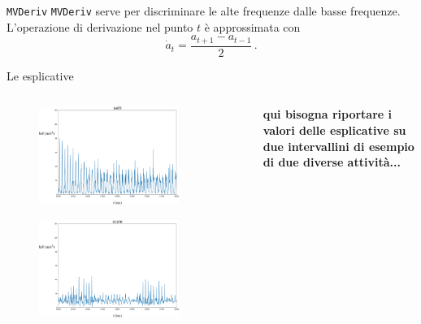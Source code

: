\documentclass{beamer}
\begin{document}
\begin{frame}{\texttt{MVDeriv}}
\texttt{MVDeriv} serve per discriminare le alte frequenze dalle basse frequenze.\\
\bigskip
L'operazione di derivazione nel punto $t$ è approssimata con\cite{NumpyGradientNumPy}
\[
\dot{a}_t = \dfrac{a_{t + 1} - a_{t - 1}}{2}\,.
\]
\end{frame}


\begin{frame}{Le esplicative}
\begin{columns}[T] %
\begin{column}{.48\textwidth}
\begin{figure}[H]
\includegraphics[width=0.8\textwidth]{../figure/salti.png}
\end{figure}
\begin{figure}[H]
\includegraphics[width=0.8\textwidth]{../figure/scale.png}
\end{figure}
\end{column}%
\hfill%
\begin{column}{.4\textwidth}
\textbf{qui bisogna riportare i valori delle esplicative su due intervallini di esempio di due diverse attività...}
\end{column}%
\end{columns}
\end{frame}
\end{document}
